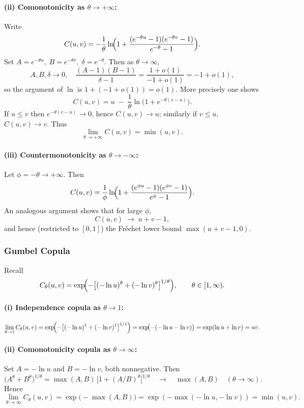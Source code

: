 \documentclass[11pt]{article}
\begin{document}
\paragraph{(ii) Comonotonicity as \(\theta\to+\infty\):}
Write
\[
C(u,v)
=-\frac1\theta\ln\!\Bigl(
1+\frac{(e^{-\theta u}-1)(e^{-\theta v}-1)}{e^{-\theta}-1}
\Bigr).
\]
Set \(A=e^{-\theta u},\;B=e^{-\theta v},\;\delta=e^{-\theta}\).  Then as \(\theta\to\infty\),
\[
A,B,\delta\to0,
\quad
\frac{(A-1)(B-1)}{\delta-1}
=\frac{1+o(1)}{-1+o(1)}=-1+o(1),
\]
so the argument of \(\ln\) is \(1+(-1+o(1))=o(1)\).  More precisely one shows
\[
C(u,v)
= u \;-\;\frac1\theta\ln\bigl(1+e^{-\theta(v-u)}\bigr).
\]
If \(u\le v\) then \(e^{-\theta(v-u)}\to0\), hence \(C(u,v)\to u\); similarly if \(v\le u\), \(C(u,v)\to v\).  Thus
\[
\lim_{\theta\to+\infty}C(u,v)=\min(u,v).
\]

\paragraph{(iii) Countermonotonicity as \(\theta\to-\infty\):}
Let \(\phi=-\theta\to+\infty\).  Then
\[
C(u,v)
=\frac1\phi\ln\!\Bigl(
1+\frac{(e^{\phi u}-1)(e^{\phi v}-1)}{e^{\phi}-1}
\Bigr).
\]
An analogous argument shows that for large \(\phi\),
\[
C(u,v)\;\longrightarrow\;u+v-1,
\]
and hence (restricted to \([0,1]\)) the Fréchet lower bound
\(\max(u+v-1,0)\).

\subsubsection{Gumbel Copula}
Recall
\[
C_\theta(u,v)
=\exp\!\Bigl(-\bigl[(-\ln u)^\theta+(-\ln v)^\theta\bigr]^{1/\theta}\Bigr),
\qquad \theta\in[1,\infty).
\]

\paragraph{(i) Independence copula as \(\theta\to1\):}
\[
\lim_{\theta\to1}C_\theta(u,v)
=\exp\!\Bigl(-\bigl[(-\ln u)^1+(-\ln v)^1\bigr]^{1/1}\Bigr)
=\exp\!\bigl(-(-\ln u-\ln v)\bigr)
=\exp(\ln u+\ln v)
=uv.
\]

\paragraph{(ii) Comonotonicity copula as \(\theta\to\infty\):}
Set \(A=-\ln u\) and \(B=-\ln v\), both nonnegative.  Then
\[
\bigl(A^\theta+B^\theta\bigr)^{1/\theta}
=\max(A,B)\,\bigl[1+(A/B)^\theta\bigr]^{1/\theta}\quad
\longrightarrow\quad\max(A,B)
\quad(\theta\to\infty).
\]
Hence
\[
\lim_{\theta\to\infty}C_\theta(u,v)
=\exp\bigl(-\max(A,B)\bigr)
=\exp(-\max(-\ln u,-\ln v))
=\min(u,v).
\]
\end{document}
